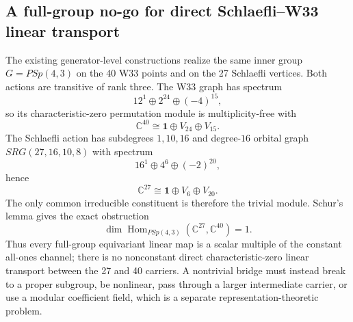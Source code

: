 \subsection{A full-group no-go for direct Schlaefli--W33 linear transport}
\label{subsec:schlafli-w33-no-go}

The existing generator-level constructions realize the same inner group
$G=PSp(4,3)$ on the 40 W33 points and on the 27 Schlaefli vertices.  Both actions
are transitive of rank three.  The W33 graph has spectrum
\[
 12^1\oplus2^{24}\oplus(-4)^{15},
\]
so its characteristic-zero permutation module is multiplicity-free with
\[
 \mathbb C^{40}\cong\mathbf1\oplus V_{24}\oplus V_{15}.
\]
The Schlaefli action has subdegrees $1,10,16$ and degree-$16$ orbital graph
$SRG(27,16,10,8)$ with spectrum
\[
 16^1\oplus4^6\oplus(-2)^{20},
\]
hence
\[
 \mathbb C^{27}\cong\mathbf1\oplus V_6\oplus V_{20}.
\]
The only common irreducible constituent is therefore the trivial module.  Schur's
lemma gives the exact obstruction
\[
 \boxed{\dim\operatorname{Hom}_{PSp(4,3)}(\mathbb C^{27},\mathbb C^{40})=1}.
\]
Thus every full-group equivariant linear map is a scalar multiple of the constant
all-ones channel; there is no nonconstant direct characteristic-zero linear transport
between the 27 and 40 carriers.  A nontrivial bridge must instead break to a proper
subgroup, be nonlinear, pass through a larger intermediate carrier, or use a modular
coefficient field, which is a separate representation-theoretic problem.
